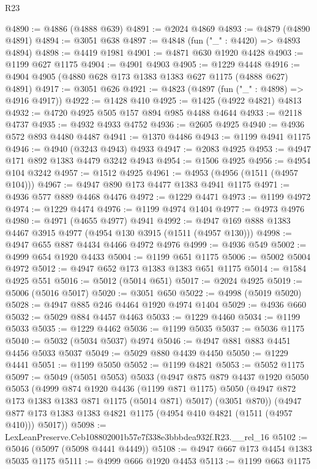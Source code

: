 \begin{lexlean}{R23}
\begin{coremodule}
@4890 := @4886 (@4888 @639)
@4891 := @2024 @4869
@4893 := @4879 (@4890 @4891)
@4894 := @3051 @638
@4897 := @4848 (fun ("_" : @4420) => @4893 @4894)
@4898 := @4419 @1981
@4901 := @4871 @630 @1920 @4428
@4903 := @1199 @627 @1175
@4904 := @4901 @4903
@4905 := @1229 @4448
@4916 := @4904 @4905 (@4880 @628 @173 @1383 @1383 @627 @1175 (@4888 @627) @4891)
@4917 := @3051 @626
@4921 := @4823 (@4897 (fun ("_" : @4898) => @4916 @4917))
@4922 := @1428 @410
@4925 := @1425 (@4922 @4821) @4813
@4932 := @4720 @4925 @505 @157 @894 @985 @4488 @4644
@4933 := @2118 @4737
@4935 := @4932 @4933 @4752
@4936 := @2605 @4925
@4940 := @4936 @572 @893 @4480 @4487
@4941 := @1370 @4486
@4943 := @1199 @4941 @1175
@4946 := @4940 (@3243 @4943) @4933
@4947 := @2083 @4925
@4953 := @4947 @171 @892 @1383 @4479 @3242 @4943
@4954 := @1506 @4925
@4956 := @4954 @104 @3242
@4957 := @1512 @4925
@4961 := @4953 (@4956 (@1511 (@4957 @104)))
@4967 := @4947 @890 @173 @4477 @1383 @4941 @1175
@4971 := @4936 @577 @889 @4468 @4476
@4972 := @1229 @4471
@4973 := @1199 @4972
@4974 := @1229 @4474
@4976 := @1199 @4974 @1404
@4977 := @4973 @4976
@4980 := @4971 (@4655 @4977) @4941
@4992 := @4947 @169 @888 @1383 @4467 @3915 @4977 (@4954 @130 @3915 (@1511 (@4957 @130)))
@4998 := @4947 @655 @887 @4434 @4466 @4972 @4976
@4999 := @4936 @549
@5002 := @4999 @654 @1920 @4433
@5004 := @1199 @651 @1175
@5006 := @5002 @5004 @4972
@5012 := @4947 @652 @173 @1383 @1383 @651 @1175
@5014 := @1584 @4925 @551
@5016 := @5012 (@5014 @651)
@5017 := @2024 @4925
@5019 := @5006 (@5016 @5017)
@5020 := @3051 @650
@5022 := @4998 (@5019 @5020)
@5028 := @4947 @885 @246 @4464 @1920 @4974 @1404
@5029 := @4936 @660
@5032 := @5029 @884 @4457 @4463
@5033 := @1229 @4460
@5034 := @1199 @5033
@5035 := @1229 @4462
@5036 := @1199 @5035
@5037 := @5036 @1175
@5040 := @5032 (@5034 @5037) @4974
@5046 := @4947 @881 @883 @4451 @4456 @5033 @5037
@5049 := @5029 @880 @4439 @4450
@5050 := @1229 @4441
@5051 := @1199 @5050
@5052 := @1199 @4821
@5053 := @5052 @1175
@5097 := @5049
    (@5051 @5053)
    @5033
    (@4947
      @875
      @879
      @4437
      @1920
      @5050
      @5053
      (@4999
        @874
        @1920
        @4436
        (@1199 @871 @1175)
        @5050
        (@4947 @872 @173 @1383 @1383 @871 @1175 (@5014 @871) @5017)
        (@3051 @870))
      (@4947 @877 @173 @1383 @1383 @4821 @1175 (@4954 @410 @4821 (@1511 (@4957 @410))) @5017))
@5098 := LexLeanPreserve.Ceb108802001b57e7f338e3bbbdea932f.R23.__rel_16
@5102 := @5046 (@5097 (@5098 @4441 @4449))
@5108 := @4947 @667 @173 @4454 @1383 @5035 @1175
@5111 := @4999 @666 @1920 @4453
@5113 := @1199 @663 @1175

\end{coremodule}
\end{lexlean}
